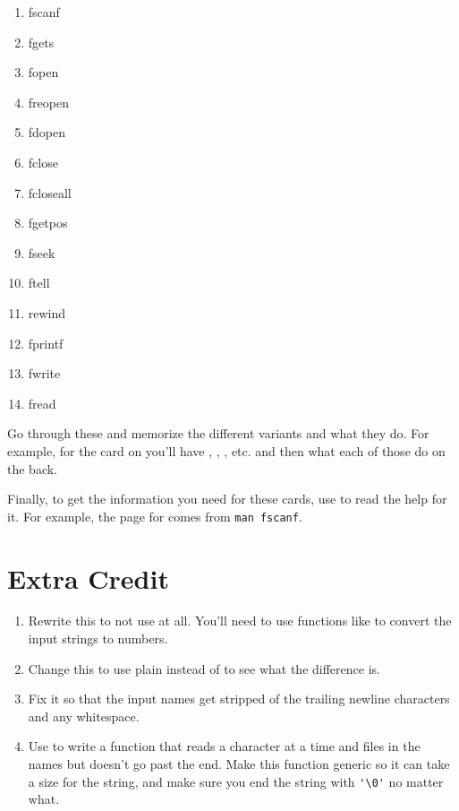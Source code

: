 \begin{enumerate}
\item fscanf
\item fgets
\item fopen
\item freopen
\item fdopen
\item fclose
\item fcloseall
\item fgetpos
\item fseek
\item ftell
\item rewind
\item fprintf
\item fwrite
\item fread
\end{enumerate}

Go through these and memorize the different variants and what they do.  For example,
for the card on  you'll have , , ,
etc. and then what each of those do on the back.

Finally, to get the information you need for these cards, use  to
read the help for it.  For example, the page for  comes from 
\verb|man fscanf|.


\section{Extra Credit}

\begin{enumerate}
\item Rewrite this to not use  at all.  You'll need to use
    functions like  to convert the input strings to numbers.
\item Change this to use plain  instead of  to
    see what the difference is.
\item Fix it so that the input names get stripped of the trailing newline
    characters and any whitespace.
\item Use  to write a function that reads a character at a time
    and files in the names but doesn't go past the end.  Make this function
    generic so it can take a size for the string, and make sure you end
    the string with \verb|'\0'| no matter what.
\end{enumerate}

